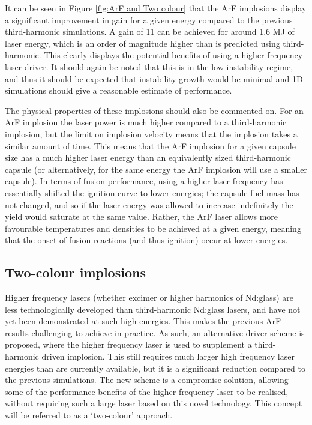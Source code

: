 It can be seen in Figure \ref{fig:ArF and Two colour} that the ArF implosions display a significant improvement in gain for a given energy compared to the previous third-harmonic simulations. A gain of 11 can be achieved for around 1.6 MJ of laser energy, which is an order of magnitude higher than is predicted using third-harmonic. This clearly displays the potential benefits of using a higher frequency laser driver. It should again be noted that this is in the low-instability regime, and thus it should be expected that instability growth would be minimal and 1D simulations should give a reasonable estimate of performance.

The physical properties of these implosions should also be commented on. For an ArF implosion the laser power is much higher compared to a third-harmonic implosion, but the limit on implosion velocity means that the implosion takes a similar amount of time. This means that the ArF implosion for a given capsule size has a much higher laser energy than an equivalently sized third-harmonic capsule (or alternatively, for the same energy the ArF implosion will use a smaller capsule). In terms of fusion performance, using a higher laser frequency has essentially shifted the ignition curve to lower energies; the capsule fuel mass has not changed, and so if the laser energy was allowed to increase indefinitely the yield would saturate at the same value. Rather, the ArF laser allows more favourable temperatures and densities to be achieved at a given energy, meaning that the onset of fusion reactions (and thus ignition) occur at lower energies. 

\subsection{Two-colour implosions}

Higher frequency lasers (whether excimer or higher harmonics of Nd:glass) are less technologically developed than third-harmonic Nd:glass lasers, and have not yet been demonstrated at such high energies. This makes the previous ArF results challenging to achieve in practice. As such, an alternative driver-scheme is proposed, where the higher frequency laser is used to supplement a third-harmonic driven implosion. This still requires much larger high frequency laser energies than are currently available, but it is a significant reduction compared to the previous simulations. The new scheme is a compromise solution, allowing some of the performance benefits of the higher frequency laser to be realised, without requiring such a large laser based on this novel technology. This concept will be referred to as a `two-colour' approach.

